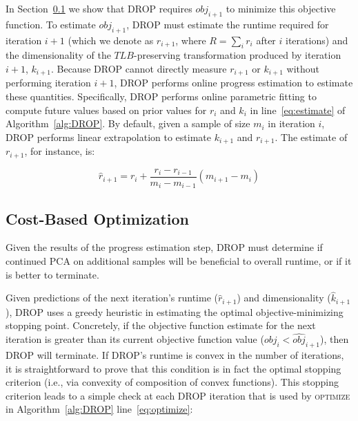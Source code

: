 In Section~\ref{subsec:opt} we show that DROP requires $obj_{i+1}$ to minimize this objective function.
To estimate $obj_{i+1}$, DROP must estimate the runtime required for iteration $i+1$ (which we denote as $r_{i+1}$, where $R=\sum_i r_i$ after $i$ iterations) and the dimensionality of the $TLB$-preserving transformation produced by iteration $i+1$, $k_{i+1}$. 
Because DROP cannot directly measure $r_{i+1}$ or $k_{i+1}$ without performing iteration $i+1$, DROP performs online progress estimation to estimate these quantities. Specifically, DROP performs online parametric fitting to compute future values based on prior values for $r_{i}$ and $k_i$ in line~\ref{eq:estimate} of Algorithm~\ref{alg:DROP}. 
By default, given a sample of size $m_i$ in iteration $i$, DROP performs linear extrapolation to estimate $k_{i+1}$ and $r_{i+1}$. The estimate of $r_{i+1}$, for instance, is:

\vspace{-.4cm}
\begin{equation*}
\hat{r}_{i+1} = r_i + \frac{r_i - r_{i-1}}{m_i - m_{i-1}} (m_{i+1} -  m_i)
\end{equation*}

\subsection{Cost-Based Optimization}
\label{subsec:opt}

Given the results of the progress estimation step, DROP must determine if continued PCA on additional samples will be beneficial to overall runtime, or if it is better to terminate. 

Given predictions of the next iteration's runtime ($\hat{r}_{i+1}$) and dimensionality ($\hat{k}_{i+1}$), DROP uses a greedy heuristic in estimating the optimal objective-minimizing stopping point.
Concretely, if the objective function estimate for the next iteration is greater than its current objective function value ($obj_i < \widehat{obj}_{i+1}$), then DROP will terminate. 
If DROP's runtime is convex in the number of iterations, it is straightforward to prove that this condition is in fact the optimal stopping criterion (i.e., via convexity of composition of convex functions). 
This stopping criterion leads to a simple check at each DROP iteration that is used by  \textsc{optimize} in Algorithm~\ref{alg:DROP} line~\ref{eq:optimize}: 

